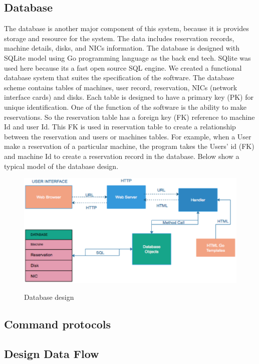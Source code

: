 \subsection{Database}
The database is another major component of this system, because it is provides storage and resource for the system. The data includes reservation records, machine details, disks, and NICs information. The database is designed with SQLite model using Go programming language as the back end tech. SQlite was used here because its a fast open source SQL engine. We created a functional database system that suites the specification of the software. 
The database scheme contains tables of machines, user record, reservation, NICs (network interface cards) and disks. Each table is designed to have a primary key (PK) for unique identification. One of the function of the software is the ability to make reservations.  So the reservation table has a foreign key (FK) reference to machine Id and user Id. This FK is used in reservation table to create a relationship between the reservation and  users or machines tables. For example, when a User make a reservation of a particular machine, the program takes the Users' id (FK) and machine Id to create a reservation record in the database. Below show a typical model of the database design.

 \begin{figure}[ht]
\includegraphics[width = \linewidth]{Design.eps}
\label{fig:Web Inteerface} 
\caption{Database design}
\end{figure}

\subsection{Command protocols}

\subsection{Design Data Flow}




